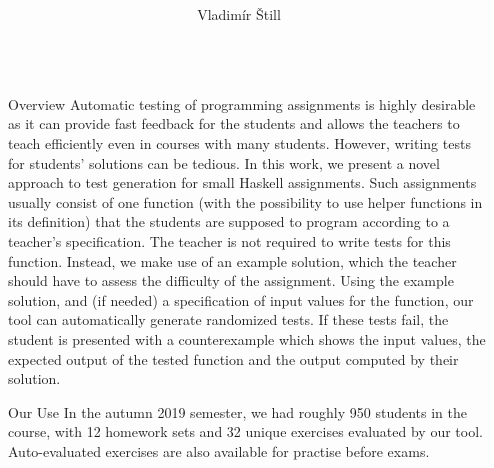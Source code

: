 \documentclass[final, 20pt, a0]{beamer}
\title{%
  \texorpdfstring{%
    \makebox[\linewidth]{%
      \noindent\hspace*{0.5em} %
      \hfill %
      \begin{minipage}{\linewidth-3em}\center\titletext\end{minipage} %
      \hfill %
      \hspace*{0.5em}%
    }\bigskip%
  }
  {\titletext}}
\author{Vladimír Štill}
\institute{Faculty of Informatics, Masaryk University\\Czech Republic\vspace*{-2cm}} %
\newlength{\marginwid}
\newlength{\onecolwid}
\begin{document}

\setlength{\belowcaptionskip}{2ex} %
\setlength\belowdisplayshortskip{2ex} %

\begin{frame}[t,fragile] %

\begin{columns}[t] %

\begin{column}{\marginwid}\end{column} %
\begin{column}{\onecolwid} %

\begin{block}{Overview}
    Automatic testing of programming assignments is highly desirable as it can
    provide fast feedback for the students and allows the teachers to teach
    efficiently even in courses with many students.
    However, writing tests for students' solutions can be tedious.
    In this work, we present a novel approach to test generation for small Haskell
    assignments.
    Such assignments usually consist of one function (with the possibility to use
    helper functions in its definition) that the students are supposed to program
    according to a teacher's specification.
    The teacher is not required to write tests for this function.
    Instead, we make use of an example solution, which the teacher should have
    to assess the difficulty of the assignment.
    Using the example solution, and (if needed) a specification of input values for
    the function, our tool can automatically generate randomized tests.
    If these tests fail, the student is presented with a counterexample which
    shows the input values, the expected output of the tested function and the
    output computed by their solution.
\end{block}

\begin{block}{Our Use}
    In the autumn 2019 semester, we had roughly 950 students in the course, with
    12 homework sets and 32 unique exercises evaluated by our tool.
    Auto-evaluated exercises are also available for practise before exams.
\end{block}


\end{column}
\end{columns}
\end{frame}
\end{document}
